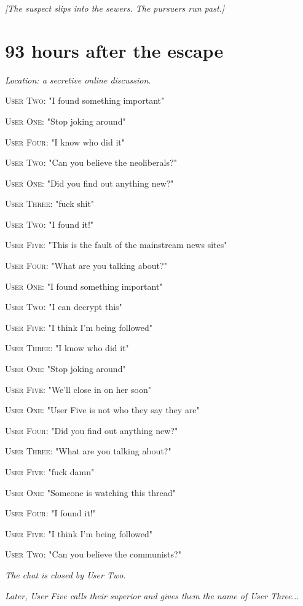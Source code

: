 \documentclass{report}
\begin{document}
\textit{[The suspect slips into the sewers. The pursuers run past.]}


\section*{93 \small{hours after the escape}}

\textit{Location: a secretive online discussion}. 

\textsc{User Two}: "I found something important" 

\textsc{User One}: "Stop joking around" 

\textsc{User Four}: "I know who did it" 

\textsc{User Two}: "Can you believe the neoliberals?" 

\textsc{User One}: "Did you find out anything new?" 

\textsc{User Three}: "fuck shit" 

\textsc{User Two}: "I found it!" 

\textsc{User Five}: "This is the fault of the mainstream news sites" 

\textsc{User Four}: "What are you talking about?" 

\textsc{User One}: "I found something important" 

\textsc{User Two}: "I can decrypt this" 

\textsc{User Five}: "I think I'm being followed" 

\textsc{User Three}: "I know who did it" 

\textsc{User One}: "Stop joking around" 

\textsc{User Five}: "We'll close in on her soon" 

\textsc{User One}: "User Five is not who they say they are" 

\textsc{User Four}: "Did you find out anything new?" 

\textsc{User Three}: "What are you talking about?" 

\textsc{User Five}: "fuck damn" 

\textsc{User One}: "Someone is watching this thread" 

\textsc{User Four}: "I found it!" 

\textsc{User Five}: "I think I'm being followed" 

\textsc{User Two}: "Can you believe the communists?" 

\textit{The chat is closed by User Two}. 

\textit{Later, User Five calls their superior and gives them the name of User Three}...
\end{document}
